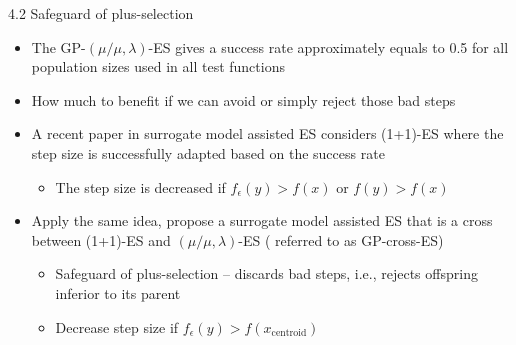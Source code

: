 \documentclass{beamer}
\begin{document}
\begin{frame}{4.2 Safeguard of plus-selection}
\begin{itemize}
    \item The GP-$(\mu/\mu,\lambda)$-ES gives a success rate approximately equals to 0.5 for all population sizes used in all test functions
    \item How much to benefit if we can avoid or simply reject those bad steps
    \item A recent paper in surrogate model assisted ES considers (1+1)-ES where the step size is successfully adapted based on the success rate
    \begin{itemize}
        \item The step size is decreased if $f_\epsilon(y)>f(x)$ or $f(y)>f(x)$
    \end{itemize}
    \item Apply the same idea, propose a surrogate model assisted ES that is a cross between (1+1)-ES and $(\mu/\mu,\lambda)$-ES ( referred to as GP-cross-ES)
        \begin{itemize}
            \item Safeguard of plus-selection -- discards bad steps, i.e., rejects offspring inferior to its parent
            \item Decrease step size if $f_\epsilon(y)>f(x_{\text{centroid}})$
        \end{itemize}
        
\end{itemize}
\end{frame}
\end{document}

